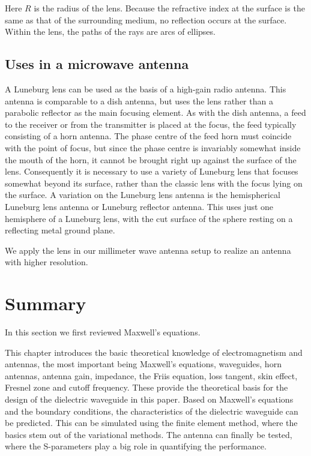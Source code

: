 \documentclass[a4paper,12pt]{report}
\begin{document}
Here $R$ is the radius of the lens.
Because the refractive index at the surface is the same
as that of the surrounding medium,
no reflection occurs at the surface.
Within the lens, the paths of the rays are arcs of ellipses.

\subsection{Uses in a microwave antenna}

A Luneburg lens can be used as the basis of a high-gain radio antenna.
This antenna is comparable to a dish antenna,
but uses the lens rather than a parabolic reflector as the main focusing element.
As with the dish antenna,
a feed to the receiver or from the transmitter is placed at the focus,
the feed typically consisting of a horn antenna.
The phase centre of the feed horn must coincide with the point of focus,
but since the phase centre is invariably somewhat inside the mouth of the horn,
it cannot be brought right up against the surface of the lens.
Consequently it is necessary to use a variety of Luneburg lens
that focuses somewhat beyond its surface,
rather than the classic lens with the focus lying on the surface.
A variation on the Luneburg lens antenna is the hemispherical
Luneburg lens antenna or Luneburg reflector antenna.
This uses just one hemisphere of a Luneburg lens,
with the cut surface of the sphere resting on a reflecting metal ground plane.

We apply the lens in our millimeter wave antenna setup to
realize an antenna with higher resolution.

\section{Summary}

In this section we first reviewed Maxwell's equations.

This chapter introduces the basic theoretical knowledge
of electromagnetism and antennas,
the most important being Maxwell's equations, waveguides, horn antennas,
antenna gain, impedance, the Friis equation, loss tangent,
skin effect, Fresnel zone and cutoff frequency.
These provide the theoretical basis for the design
of the dielectric waveguide in this paper.
Based on
Maxwell's equations and the boundary conditions,
the characteristics of the dielectric waveguide can be predicted.
This can be simulated using the finite element method,
where the basics stem out of the variational methods.
The antenna can finally be tested,
where the S-parameters play a big role in
quantifying the performance.
\end{document}
